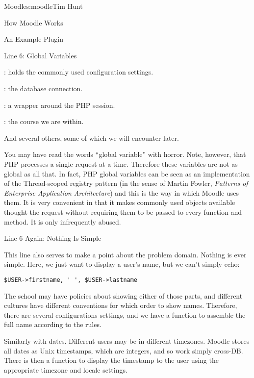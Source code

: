 \begin{aosachapter}{Moodle}{s:moodle}{Tim Hunt}
\begin{aosasect1}{How Moodle Works}
\begin{aosasect2}{An Example Plugin}
\begin{aosasect3}{Line 6: Global Variables}
\begin{aosaitemize}
\item {}: holds the commonly used configuration settings.

\item {}: the database connection.

\item {}: a wrapper around the PHP session.

\item {}: the course we are within.

\item And several others, some of which we will encounter later.

\end{aosaitemize}

You may have read the words ``global variable'' with horror. Note,
however, that PHP processes a single request at a time. Therefore
these variables are not as global as all that. In fact, PHP global
variables can be seen as an implementation of the Thread-scoped
registry pattern (in the sense of Martin Fowler, \emph{Patterns of
  Enterprise Application Architecture}) and this is the way in which
Moodle uses them. It is very convenient in that it makes commonly used
objects available thought the request without requiring them to be
passed to every function and method. It is only infrequently abused.

\end{aosasect3}

\begin{aosasect3}{Line 6 Again: Nothing Is Simple}

This line also serves to make a point about the problem
domain. Nothing is ever simple. Here, we just want to display a user's
name, but we can't simply echo:

\begin{verbatim}
$USER->firstname, ' ', $USER->lastname
\end{verbatim}

The school may have policies about showing either of those parts, and
different cultures have different conventions for which order to show
names. Therefore, there are several configurations settings, and we
have a function to assemble the full name according to the rules.

Similarly with dates. Different users may be in different
timezones. Moodle stores all dates as Unix timestamps, which are
integers, and so work simply cross-DB. There is then a
 function to display the timestamp to the user using
the appropriate timezone and locale settings.


\end{aosasect3}
\end{aosasect2}
\end{aosasect1}
\end{aosachapter}

